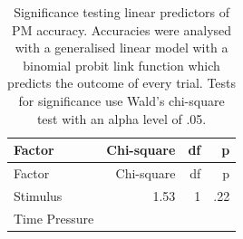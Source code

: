 \documentclass[11pt,]{article}
\begin{document}
\begin{longtable}[]{@{}lrrr@{}}
\caption{Significance testing linear predictors of PM accuracy.
Accuracies were analysed with a generalised linear model with a binomial
probit link function which predicts the outcome of every trial. Tests
for significance use Wald's chi-square test with an alpha level of
.05.}\tabularnewline
\toprule
\begin{minipage}[b]{0.32\columnwidth}\raggedright\strut
Factor\strut
\end{minipage} & \begin{minipage}[b]{0.16\columnwidth}\raggedleft\strut
Chi-square\strut
\end{minipage} & \begin{minipage}[b]{0.06\columnwidth}\raggedleft\strut
df\strut
\end{minipage} & \begin{minipage}[b]{0.06\columnwidth}\raggedleft\strut
p\strut
\end{minipage}\tabularnewline
\midrule
\endfirsthead
\toprule
\begin{minipage}[b]{0.32\columnwidth}\raggedright\strut
Factor\strut
\end{minipage} & \begin{minipage}[b]{0.16\columnwidth}\raggedleft\strut
Chi-square\strut
\end{minipage} & \begin{minipage}[b]{0.06\columnwidth}\raggedleft\strut
df\strut
\end{minipage} & \begin{minipage}[b]{0.06\columnwidth}\raggedleft\strut
p\strut
\end{minipage}\tabularnewline
\midrule
\endhead
\begin{minipage}[t]{0.32\columnwidth}\raggedright\strut
Stimulus\strut
\end{minipage} & \begin{minipage}[t]{0.16\columnwidth}\raggedleft\strut
1.53\strut
\end{minipage} & \begin{minipage}[t]{0.06\columnwidth}\raggedleft\strut
1\strut
\end{minipage} & \begin{minipage}[t]{0.06\columnwidth}\raggedleft\strut
.22\strut
\end{minipage}\tabularnewline
\begin{minipage}[t]{0.32\columnwidth}\raggedright\strut
Time Pressure\strut
\end{minipage} & \begin{minipage}[t]{0.16\columnwidth}\raggedleft\strut

\end{minipage}
\end{longtable}
\end{document}
